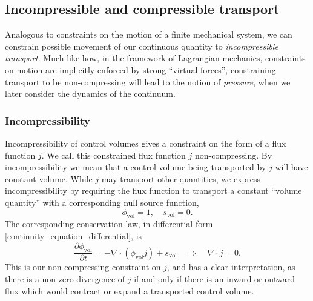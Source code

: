 \documentclass[11pt,a4paper]{memoir}
\newcommand{\Part}[2]{\frac{\partial #1}{\partial #2}}
\begin{document}
\subsection{Incompressible and compressible transport}
Analogous to constraints on the motion of a finite mechanical system,
we can constrain possible movement of our continuous quantity to \textit{incompressible transport}. Much like how, in the framework of Lagrangian mechanics,
constraints on motion are implicitly enforced by strong ``virtual forces'', constraining transport to be non-compressing will lead to
the notion of \textit{pressure}, when we later consider the dynamics of the continuum.

\subsubsection{Incompressibility}
Incompressibility of control volumes gives a constraint on the form of a flux function $j$.
We call this constrained flux function $j$ non-compressing.
By incompressibility we mean that a control volume being transported by $j$ will have
constant volume. While $j$ may transport other quantities, we express incompressibility by requiring the flux function to transport a constant ``volume quantity''
with a corresponding null source function,
    $$\phi_{\text{vol}} = 1,\quad s_{\text{vol}} = 0.$$
The corresponding conservation law, in differential form \eqref{continuity_equation_differential}, is
\begin{equation}\label{volume_conservation_law}
    \Part{\phi_{\text{vol}}}{t} = -\nabla \cdot (\phi_{\text{vol}}j) + s_{\text{vol}}
        \quad\Rightarrow\quad \nabla\cdot j = 0.
\end{equation}
This is our non-compressing constraint on $j$, and has a clear interpretation, as there is a non-zero divergence of $j$ if and only if
there is an inward or outward flux which would contract or expand a transported control volume.
\end{document}
